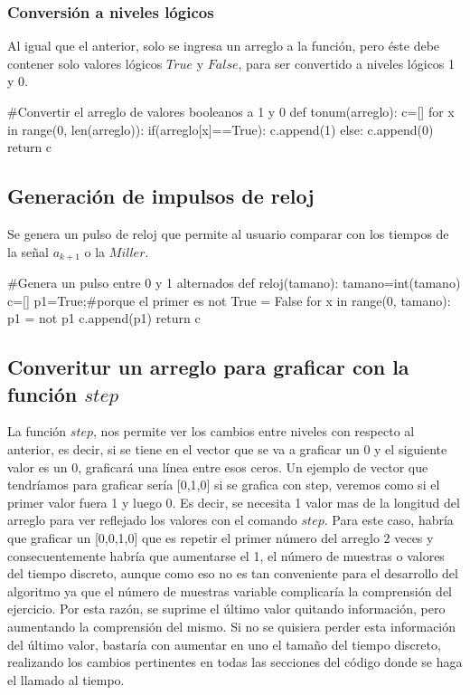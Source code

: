\documentclass{article}
\begin{document}
\subsubsection{Conversión a niveles lógicos}

Al igual que el anterior, solo se ingresa un arreglo a la función, pero éste debe contener solo valores lógicos $True$ y $False$, para ser convertido a niveles lógicos 1 y 0.

\begin{python}
#Convertir el arreglo de valores booleanos a 1 y 0
def tonum(arreglo):
    c=[]    
    for x in range(0, len(arreglo)):
        if(arreglo[x]==True):
            c.append(1)
        else:
            c.append(0)
    return c
\end{python}

\subsection{Generación de impulsos de reloj}

Se genera un pulso de reloj que permite al usuario comparar con los tiempos de la señal $a_{k+1}$ o la $Miller$.

\begin{python}
#Genera un pulso entre 0 y 1 alternados
def reloj(tamano):
    tamano=int(tamano)
    c=[]
    p1=True;#porque el primer es not True = False
    for x in range(0, tamano):
        p1 = not p1
        c.append(p1)
    return c
\end{python}

\subsection{Converitur un arreglo para graficar con la función $step$}

La función $step$, nos permite ver los cambios entre niveles con respecto al anterior, es decir, si se tiene en el vector que se va a graficar un 0 y el siguiente valor es un 0, graficará una línea entre esos ceros. Un ejemplo de vector que tendríamos para graficar sería [0,1,0] si se grafica con step, veremos como si el primer valor fuera 1 y luego 0. Es decir, se necesita 1 valor mas de la longitud del arreglo para ver reflejado los valores con el comando $step$. Para este caso, habría que graficar un [0,0,1,0] que es repetir el primer número del arreglo 2 veces y consecuentemente habría que aumentarse el 1, el número de muestras o valores del tiempo discreto, aunque como eso no es tan conveniente para el desarrollo del algoritmo ya que el número de muestras variable complicaría la comprensión del ejercicio. Por esta razón, se suprime el último valor quitando información, pero aumentando la comprensión del mismo. Si no se quisiera perder esta información del último valor, bastaría con aumentar en uno el tamaño del tiempo discreto, realizando los cambios pertinentes en todas las secciones del código donde se haga el llamado al tiempo.
\end{document}
